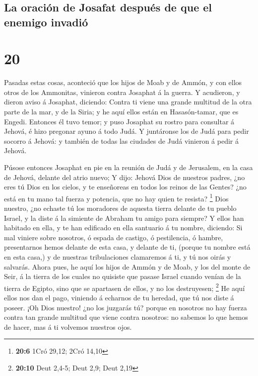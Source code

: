 \hypertarget{la-oraciuxf3n-de-josafat-despuuxe9s-de-que-el-enemigo-invadiuxf3}{%
\subsection{La oración de Josafat después de que el enemigo
invadió}\label{la-oraciuxf3n-de-josafat-despuuxe9s-de-que-el-enemigo-invadiuxf3}}

\hypertarget{section-19}{%
\section{20}\label{section-19}}

 Pasadas estas cosas, aconteció que los hijos de Moab y de
Ammón, y con ellos otros de los Ammonitas, vinieron contra Josaphat á la
guerra.  Y acudieron, y dieron aviso á Josaphat, diciendo:
Contra ti viene una grande multitud de la otra parte de la mar, y de la
Siria; y he aquí ellos están en Hasasón-tamar, que es Engedi.
 Entonces él tuvo temor; y puso Josaphat su rostro para
consultar á Jehová, é hizo pregonar ayuno á todo Judá.  Y
juntáronse los de Judá para pedir socorro á Jehová: y también de todas
las ciudades de Judá vinieron á pedir á Jehová.

 Púsose entonces Josaphat en pie en la reunión de Judá y
de Jerusalem, en la casa de Jehová, delante del atrio nuevo;
 Y dijo: Jehová Dios de nuestros padres, ¿no eres tú Dios
en los cielos, y te enseñoreas en todos los reinos de las Gentes? ¿no
está en tu mano tal fuerza y potencia, que no hay quien te resista?
\footnote{\textbf{20:6} 1Cró 29,12; 2Cró 14,10}  Dios
nuestro, ¿no echaste tú los moradores de aquesta tierra delante de tu
pueblo Israel, y la diste á la simiente de Abraham tu amigo para
siempre?  Y ellos han habitado en ella, y te han edificado
en ella santuario á tu nombre, diciendo:  Si mal viniere
sobre nosotros, ó espada de castigo, ó pestilencia, ó hambre,
presentarnos hemos delante de esta casa, y delante de ti, (porque tu
nombre está en esta casa,) y de nuestras tribulaciones clamaremos á ti,
y tú nos oirás y salvarás.  Ahora pues, he aquí los hijos
de Ammón y de Moab, y los del monte de Seir, á la tierra de los cuales
no quisiste que pasase Israel cuando venían de la tierra de Egipto, sino
que se apartasen de ellos, y no los destruyesen; \footnote{\textbf{20:10}
  Deut 2,4-5; Deut 2,9; Deut 2,19}  He aquí ellos nos dan
el pago, viniendo á echarnos de tu heredad, que tú nos diste á poseer.
 ¡Oh Dios nuestro! ¿no los juzgarás tú? porque en
nosotros no hay fuerza contra tan grande multitud que viene contra
nosotros: no sabemos lo que hemos de hacer, mas á ti volvemos nuestros
ojos.

